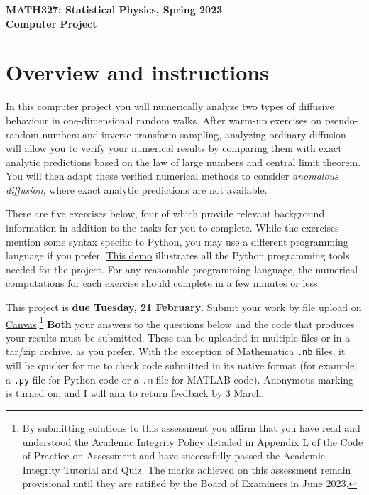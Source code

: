 \documentclass[12 pt]{article} %
\begin{document}
\newcommand{\thisunit}{MATH327 Project}
\newcommand{\moddate}{Last modified 7 Feb.~2023}
\begin{center}
  {\Large \textbf{MATH327: Statistical Physics, Spring 2023}} \\[12 pt]
  {\Large \textbf{Computer Project}} \\[24 pt]
\end{center}

\section*{Overview and instructions}
In this computer project you will numerically analyze two types of diffusive behaviour in one-dimensional random walks.
After warm-up exercises on pseudo-random numbers and inverse transform sampling, analyzing ordinary diffusion will allow you to verify your numerical results by comparing them with exact analytic predictions based on the law of large numbers and central limit theorem.
You will then adapt these verified numerical methods to consider \textit{anomalous diffusion}, where exact analytic predictions are not available.

There are five exercises below, four of which provide relevant background information in addition to the tasks for you to complete.
While the exercises mention some syntax specific to Python, you may use a different programming language if you prefer.
\href{https://tinyurl.com/math327demo}{This demo} illustrates all the Python programming tools needed for the project.
For any reasonable programming language, the numerical computations for each exercise should complete in a few minutes or less.

This project is \textbf{due Tuesday, 21 February}.
Submit your work by file upload \href{https://canvas.liverpool.ac.uk/courses/60601/assignments/226598}{on Canvas}.\footnote{By submitting solutions to this assessment you affirm that you have read and understood the \href{https://www.liverpool.ac.uk/media/livacuk/tqsd/code-of-practice-on-assessment/appendix_L_cop_assess.pdf}{Academic Integrity Policy} detailed in Appendix L of the Code of Practice on Assessment and have successfully passed the Academic Integrity Tutorial and Quiz.  The marks achieved on this assessment remain provisional until they are ratified by the Board of Examiners in June 2023.}
\textbf{Both} your answers to the questions below and the code that produces your results must be submitted.
These can be uploaded in multiple files or in a tar/zip archive, as you prefer.
With the exception of Mathematica \texttt{.nb} files, it will be quicker for me to check code submitted in its native format (for example, a \texttt{.py} file for Python code or a \texttt{.m} file for MATLAB code).
Anonymous marking is turned on, and I will aim to return feedback by 3 March.
\end{document}

